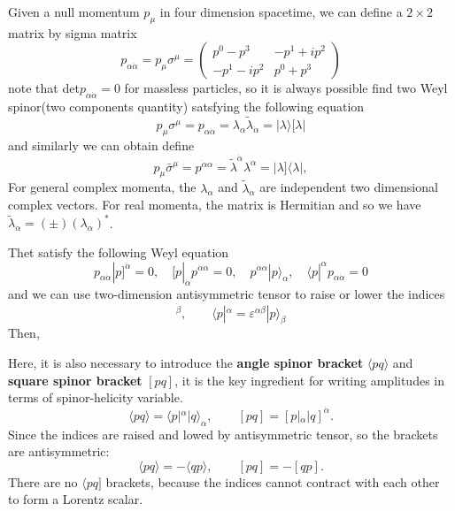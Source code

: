 \documentclass[12pt]{article}
\numberwithin{equation}{section}
\newcommand{\avg}[1]{\langle #1 \rangle}
\newcommand{\aket}[1]{|#1\rangle}
\newcommand{\sket}[1]{|#1]}
\begin{document}
Given a null momentum $p_\mu$ in four dimension spacetime, we can define a $2\times2$ matrix by sigma matrix 
\begin{equation*}
    p_{\alpha\dot{\alpha}}=p_\mu\sigma^\mu=\begin{pmatrix}
        p^0-p^3 & -p^1+ip^2\\
        -p^1-ip^2 & p^0+p^3
    \end{pmatrix}
\end{equation*}
note that det$p_{\alpha\dot{\alpha}}=0$ for massless particles, so it is always possible find two Weyl spinor(two components quantity) satsfying the following equation
\begin{equation}
    p_\mu \sigma^\mu=p_{\alpha\dot{\alpha}}=\lambda_\alpha \tilde{\lambda}_{\dot{\alpha}}=\aket{\lambda}[\lambda|
    \label{2.1}
\end{equation}
and similarly we can obtain define
\begin{equation}
    p_\mu \bar{\sigma}^\mu=p^{\dot{\alpha}\alpha}=\tilde{\lambda}^{\dot{\alpha}}\lambda^\alpha=\sket{\lambda} \langle \lambda |,
\end{equation}
For general complex momenta, the $\lambda_\alpha$ and $\tilde{\lambda}_{\dot{\alpha}}$ are independent two dimensional complex vectors. For real momenta, the matrix is Hermitian and 
so we have $\tilde{\lambda}_{\dot{\alpha}}=(\pm)(\lambda_\alpha)^*$.

Thet satisfy the following Weyl equation
\begin{equation}
    p_{\alpha\dot{\alpha}}\sket{p}^{\dot{\alpha}}=0,\quad [p|_{\dot{\alpha}}p^{\dot{\alpha}\alpha}=0,\quad p^{\dot{\alpha}\alpha}\aket{p}_\alpha,\quad \langle p|^\alpha p_{\alpha\dot{\alpha}}=0
\end{equation}
and we can use two-dimension antisymmetric tensor to raise or lower the indices
\begin{equation}
    [p|_{\dot{\alpha}}=\varepsilon _{\dot{\alpha}\dot{\beta}}\sket{p}^{\dot{\beta}},\qquad \langle p|^\alpha=\varepsilon^{\alpha\beta}\aket{p}_{\beta}
\end{equation}
\noindent
Then,


\vspace{1em}
Here, it is also necessary to introduce the \textbf{angle spinor bracket} $\avg{pq}$ and \textbf{square spinor bracket} $[pq]$, it is the key ingredient for writing amplitudes in terms of spinor-helicity variable.
\begin{equation}
    \avg{pq}=\langle p|^\alpha \aket{q}_\alpha,\qquad [pq]=[p|_{\dot{\alpha}}|q]^{\dot{\alpha}}.
\end{equation}
Since the indices are raised and lowed by antisymmetric tensor, so the brackets are antisymmetric:
\begin{equation}
    \avg{pq}=-\avg{qp},\qquad [pq]=-[qp].
\end{equation}
There are no $\langle pq]$ brackets, because the indices cannot contract with each other to form a Lorentz scalar.
\end{document}
